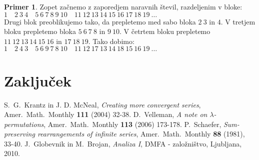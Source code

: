 \documentclass[12pt,a4paper,reqno]{amsart}
\theoremstyle{definition} %
\newtheorem{primer}[definicija]{Primer}
\theoremstyle{plain} %
\begin{document}
\begin{primer}
Zopet začnemo z zaporedjem naravnih števil, razdeljenim v bloke:\\

$1 \quad 2\: 3\: 4\quad 5\: 6\: 7\: 8\: 9\: 10 \quad 11\: 12\: 13\: 14\: 15\: 16\:17\: 18\: 19\: \ldots $\\

Drugi blok preoblikujemo tako, da prepletemo med sabo bloka $2\: 3$ in $4$. V tretjem bloku prepletemo bloka $5\: 6\: 7\: 8$ in $9\: 10$. V četrtem bloku prepletemo $11\: 12\: 13\: 14\: 15\: 16$ in $17\: 18\: 19$. Tako dobimo:\\

$1 \quad 2\: 4\: 3\quad 5\: 6\: 9\: 7\: 8\: 10 \quad 11\: 12\: 17\: 13\: 14\: 18\: 15\: 16\: 19\: \ldots $

\end{primer}

\section{Zaključek}



\begin{thebibliography}{99}

S.~G.~Krantz in J. D. McNeal, \textit{Creating more convergent series}, Amer.~Math.~Monthly \textbf{111} (2004) 32-38.
D.~Velleman, \textit{A note on $\lambda$-permutations}, Amer.~Math.~Monthly \textbf{113} (2006) 173-178.
P.~Schaefer, \textit{Sum-preserving rearrangements of infinite series}, Amer.~Math.~Monthly \textbf{88} (1981), 33-40.
J.~Globevnik in M.~Brojan, \textit{Analiza I},  DMFA - založništvo, Ljubljana, 2010.

\end{thebibliography}
\end{document}
